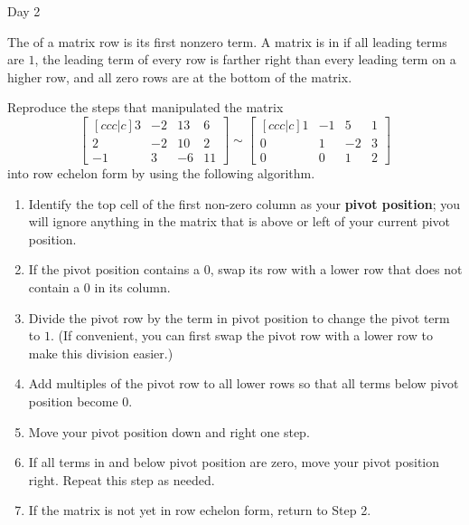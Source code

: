 \begin{applicationActivities}{Day 2}
\begin{definition}
  The  of a matrix row is its first nonzero term.
  A matrix is in  if all leading terms are \(1\),
  the leading term of every row
  is farther right than every leading term on a higher row, and all zero
  rows are at the bottom of the matrix.
\end{definition}

\begin{activity}{10}
  Reproduce the steps that manipulated the matrix
  \[
    \begin{bmatrix}[ccc|c]
      3 & -2 & 13 & 6 \\
      2 & -2 & 10 & 2 \\
      -1 & 3 & -6 & 11
    \end{bmatrix}\sim
    \begin{bmatrix}[ccc|c]
      1 & -1 &  5 & 1 \\
      0 &  1 & -2 & 3 \\
      0 &  0 &  1 & 2
    \end{bmatrix}
  \]
  into row echelon form by using the following algorithm.
  \begin{multicols}{2}\noindent
  \begin{enumerate}
    \item Identify
    the top cell of the first non-zero column as your \textbf{pivot position};
    you will ignore anything in the matrix that is above or left of your
    current pivot position.
    \item If the pivot position contains a \(0\), swap its row with a lower
          row that does not contain a \(0\) in its column.
    \item Divide the pivot row by the term in pivot position to change the
          pivot term to \(1\). (If convenient, you can first swap the
          pivot row with a lower row to make this division easier.)
    \item Add multiples of the pivot row to all lower rows so that all terms
          below pivot position become \(0\).
    \item Move your pivot position down and right one step.
    \item If all terms in and below pivot position are zero, move your
          pivot position right. Repeat this step as needed.
    \item If the matrix is not yet in row echelon form, return to Step 2.
  \end{enumerate}
  \end{multicols}
\end{activity}


\end{applicationActivities}
